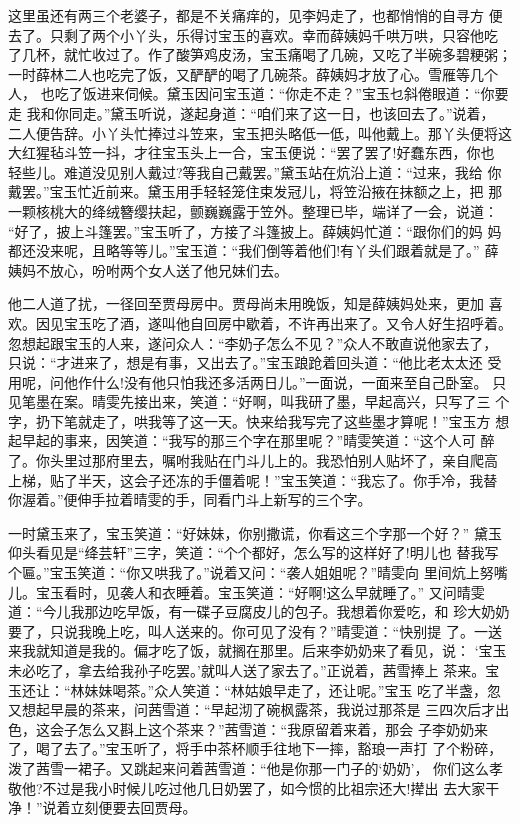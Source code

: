 这里虽还有两三个老婆子，都是不关痛痒的，见李妈走了，也都悄悄的自寻方
便去了。只剩了两个小丫头，乐得讨宝玉的喜欢。幸而薛姨妈千哄万哄，只容他吃
了几杯，就忙收过了。作了酸笋鸡皮汤，宝玉痛喝了几碗，又吃了半碗多碧粳粥；
一时薛林二人也吃完了饭，又酽酽的喝了几碗茶。薛姨妈才放了心。雪雁等几个人，
也吃了饭进来伺候。黛玉因问宝玉道：“你走不走？”宝玉乜斜倦眼道：“你要走
我和你同走。”黛玉听说，遂起身道：“咱们来了这一日，也该回去了。”说着，
二人便告辞。小丫头忙捧过斗笠来，宝玉把头略低一低，叫他戴上。那丫头便将这
大红猩毡斗笠一抖，才往宝玉头上一合，宝玉便说：“罢了罢了!好蠢东西，你也
轻些儿。难道没见别人戴过?等我自己戴罢。”黛玉站在炕沿上道：“过来，我给
你戴罢。”宝玉忙近前来。黛玉用手轻轻笼住束发冠儿，将笠沿掖在抹额之上，把
那一颗核桃大的绛绒簪缨扶起，颤巍巍露于笠外。整理已毕，端详了一会，说道：
“好了，披上斗篷罢。”宝玉听了，方接了斗篷披上。薛姨妈忙道：“跟你们的妈
妈都还没来呢，且略等等儿。”宝玉道：“我们倒等着他们!有丫头们跟着就是了。”
薛姨妈不放心，吩咐两个女人送了他兄妹们去。

他二人道了扰，一径回至贾母房中。贾母尚未用晚饭，知是薛姨妈处来，更加
喜欢。因见宝玉吃了酒，遂叫他自回房中歇着，不许再出来了。又令人好生招呼着。
忽想起跟宝玉的人来，遂问众人：“李奶子怎么不见？”众人不敢直说他家去了，
只说：“才进来了，想是有事，又出去了。”宝玉踉跄着回头道：“他比老太太还
受用呢，问他作什么!没有他只怕我还多活两日儿。”一面说，一面来至自己卧室。
只见笔墨在案。晴雯先接出来，笑道：“好啊，叫我研了墨，早起高兴，只写了三
个字，扔下笔就走了，哄我等了这一天。快来给我写完了这些墨才算呢！”宝玉方
想起早起的事来，因笑道：“我写的那三个字在那里呢？”晴雯笑道：“这个人可
醉了。你头里过那府里去，嘱咐我贴在门斗儿上的。我恐怕别人贴坏了，亲自爬高
上梯，贴了半天，这会子还冻的手僵着呢！”宝玉笑道：“我忘了。你手冷，我替
你渥着。”便伸手拉着晴雯的手，同看门斗上新写的三个字。

一时黛玉来了，宝玉笑道：“好妹妹，你别撒谎，你看这三个字那一个好？”
黛玉仰头看见是“绛芸轩”三字，笑道：“个个都好，怎么写的这样好了!明儿也
替我写个匾。”宝玉笑道：“你又哄我了。”说着又问：“袭人姐姐呢？”晴雯向
里间炕上努嘴儿。宝玉看时，见袭人和衣睡着。宝玉笑道：“好啊!这么早就睡了。”
又问晴雯道：“今儿我那边吃早饭，有一碟子豆腐皮儿的包子。我想着你爱吃，和
珍大奶奶要了，只说我晚上吃，叫人送来的。你可见了没有？”晴雯道：“快别提
了。一送来我就知道是我的。偏才吃了饭，就搁在那里。后来李奶奶来了看见，说：
‘宝玉未必吃了，拿去给我孙子吃罢。’就叫人送了家去了。”正说着，茜雪捧上
茶来。宝玉还让：“林妹妹喝茶。”众人笑道：“林姑娘早走了，还让呢。”宝玉
吃了半盏，忽又想起早晨的茶来，问茜雪道：“早起沏了碗枫露茶，我说过那茶是
三四次后才出色，这会子怎么又斟上这个茶来？”茜雪道：“我原留着来着，那会
子李奶奶来了，喝了去了。”宝玉听了，将手中茶杯顺手往地下一摔，豁琅一声打
了个粉碎，泼了茜雪一裙子。又跳起来问着茜雪道：“他是你那一门子的‘奶奶’，
你们这么孝敬他?不过是我小时候儿吃过他几日奶罢了，如今惯的比祖宗还大!撵出
去大家干净！”说着立刻便要去回贾母。

